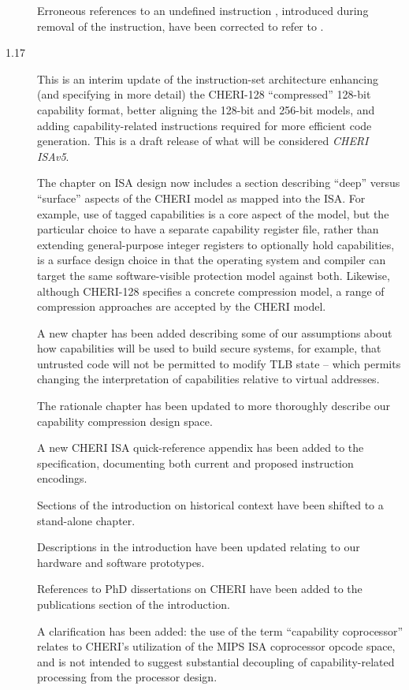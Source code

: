 \begin{description}
  Erroneous references to an undefined instruction ,
  introduced during removal of the  instruction, have
  been corrected to refer to .

\item[1.17] This is an interim update of the instruction-set architecture
  enhancing (and specifying in more detail) the CHERI-128 ``compressed''
  128-bit capability format, better aligning the 128-bit and 256-bit models,
  and adding capability-related instructions required for more efficient code
  generation.
  This is a draft release of what will be considered \textit{CHERI ISAv5}.

  The chapter on ISA design now includes a section describing ``deep'' versus
  ``surface'' aspects of the CHERI model as mapped into the ISA.
  For example, use of tagged capabilities is a core aspect of the model, but
  the particular choice to have a separate capability register file, rather
  than extending general-purpose integer registers to optionally hold capabilities, is
  a surface design choice in that the operating system and compiler can target
  the same software-visible protection model against both.
  Likewise, although CHERI-128 specifies a concrete compression model, a range
  of compression approaches are accepted by the CHERI model.

  A new chapter has been added describing some of our assumptions about how
  capabilities will be used to build secure systems, for example, that
  untrusted code will not be permitted to modify TLB state -- which permits
  changing the interpretation of capabilities relative to virtual addresses.

  The rationale chapter has been updated to more thoroughly describe our
  capability compression design space.

  A new CHERI ISA quick-reference appendix has been added to the
  specification, documenting both current and proposed instruction
  encodings.

  Sections of the introduction on historical context have been shifted to a
  stand-alone chapter.

  Descriptions in the introduction have been updated relating to
  our hardware and software prototypes.

  References to PhD dissertations on CHERI have been added to the publications
  section of the introduction.

  A clarification has been added: the use of the term ``capability
  coprocessor'' relates to CHERI's utilization of the MIPS ISA coprocessor
  opcode space, and is not intended to suggest substantial decoupling of
  capability-related processing from the processor design.


\end{description}
